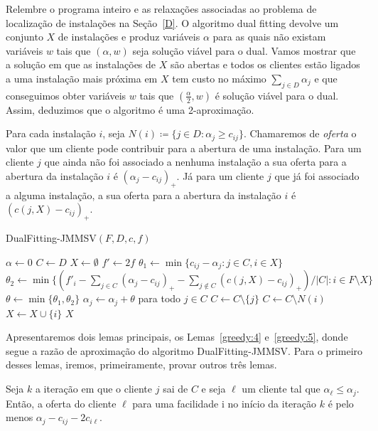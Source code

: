 Relembre o programa inteiro e as relaxações associadas ao problema de localização de instalações na Seção~\ref{D}. 
O algoritmo dual fitting devolve um conjunto $X$ de instalações e produz variáveis $\alpha$ para as quais não existam variáveis $w$ tais que $(\alpha,w)$ seja solução viável para o dual. 
Vamos mostrar que a solução em que as instalações de $X$ são abertas e todos os clientes estão ligados a uma instalação mais próxima em $X$ tem custo no máximo $\sum_{j \in D} \alpha_j$ e que conseguimos obter variáveis $w$ tais que $(\frac{\alpha}{2},w)$ é solução viável para o dual. 
Assim, deduzimos que o algoritmo é uma 2-aproximação.

Para cada instalação $i$, seja $N(i) \coloneqq \{j \in D: \alpha_j \geq c_{ij}\}$. Chamaremos de \emph{oferta} o valor que um cliente pode contribuir para a abertura de uma instalação. Para um cliente $j$ que ainda não foi associado a nenhuma instalação a sua oferta para a abertura da instalação $i$ é $(\alpha_j - c_{ij})_+$. Já para um cliente $j$ que já foi associado a alguma instalação, a sua oferta para a abertura da instalação $i$ é $(c(j,X) - c_{ij})_+$.

\begin{algorithm}
    \caption{\sc DualFitting-JMMSV$(F,D,c,f)$}
    \begin{algorithmic}[1]
    \State $\alpha \gets 0$
    \State $C \gets D$
    \State $X \gets \emptyset$
    \State $f' \gets 2f$
    \State $\theta_1 \gets \min\{c_{ij} - \alpha_j:j \in C,i\in X\}$
    \State $\theta_2 \gets \min\{(f'_i - \sum_{j \in C}(\alpha_j - c_{ij})_+ - \sum_{j \not \in C}(c(j,X) - c_{ij})_+)/|C|: i \in F \setminus X\}$
    \State $\theta \gets \min\{\theta_1,\theta_2\}$
    \State $\alpha_j \gets \alpha_j + \theta$ para todo $j \in C$
    \State $C \gets C \setminus \{j\}$
    \EndIf
    \State $C \gets C\setminus N(i)$
    \State $X \gets X \cup \{i\}$
    \EndIf
    \EndWhile
    \State \Return $X$
    \end{algorithmic}
\end{algorithm}
Apresentaremos dois lemas principais, os Lemas~\ref{greedy:4} e~\ref{greedy:5}, donde segue a razão de aproximação do algoritmo {\sc DualFitting-JMMSV}.
Para o primeiro desses lemas, iremos, primeiramente, provar outros três lemas.

\begin{lemma}
    \label{upbound_bid}
    Seja $k$ a iteração em que o cliente $j$ sai de $C$ e seja $\ell$ um cliente tal que $\alpha_\ell \leq \alpha_j$. Então, a oferta do cliente $\ell$ para uma facilidade i no início da iteração $k$ é pelo menos $\alpha_j - c_{ij} - 2c_{i\ell}$.
\end{lemma}

